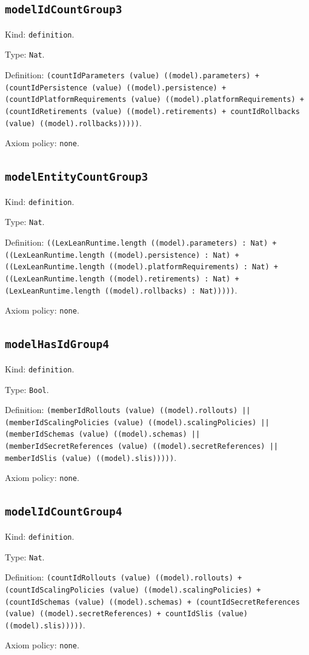 \documentclass[11pt]{article}
\begin{document}
\subsection*{\texttt{modelIdCountGroup3}}
\noindent Kind: \texttt{definition}.\par
\noindent Type: \texttt{Nat}.\par
\noindent Definition: \texttt{(countIdParameters (value) ((model).parameters) + (countIdPersistence (value) ((model).persistence) + (countIdPlatformRequirements (value) ((model).platformRequirements) + (countIdRetirements (value) ((model).retirements) + countIdRollbacks (value) ((model).rollbacks)))))}.\par
\noindent Axiom policy: \texttt{none}.\par
\subsection*{\texttt{modelEntityCountGroup3}}
\noindent Kind: \texttt{definition}.\par
\noindent Type: \texttt{Nat}.\par
\noindent Definition: \texttt{((LexLeanRuntime.length ((model).parameters) : Nat) + ((LexLeanRuntime.length ((model).persistence) : Nat) + ((LexLeanRuntime.length ((model).platformRequirements) : Nat) + ((LexLeanRuntime.length ((model).retirements) : Nat) + (LexLeanRuntime.length ((model).rollbacks) : Nat)))))}.\par
\noindent Axiom policy: \texttt{none}.\par
\subsection*{\texttt{modelHasIdGroup4}}
\noindent Kind: \texttt{definition}.\par
\noindent Type: \texttt{Bool}.\par
\noindent Definition: \texttt{(memberIdRollouts (value) ((model).rollouts) || (memberIdScalingPolicies (value) ((model).scalingPolicies) || (memberIdSchemas (value) ((model).schemas) || (memberIdSecretReferences (value) ((model).secretReferences) || memberIdSlis (value) ((model).slis)))))}.\par
\noindent Axiom policy: \texttt{none}.\par
\subsection*{\texttt{modelIdCountGroup4}}
\noindent Kind: \texttt{definition}.\par
\noindent Type: \texttt{Nat}.\par
\noindent Definition: \texttt{(countIdRollouts (value) ((model).rollouts) + (countIdScalingPolicies (value) ((model).scalingPolicies) + (countIdSchemas (value) ((model).schemas) + (countIdSecretReferences (value) ((model).secretReferences) + countIdSlis (value) ((model).slis)))))}.\par
\noindent Axiom policy: \texttt{none}.\par
\end{document}
